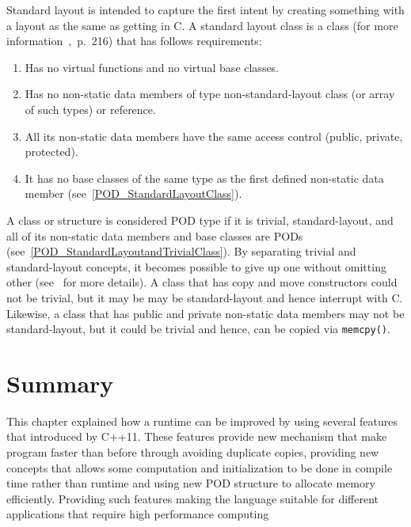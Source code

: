 \documentclass[11pt]{report}
\begin{document}
Standard layout is intended to capture the first intent by creating something with a layout as the same as getting in C. A standard layout class is a class (for more information~\cite{ISO:2011:Cpplanguage},~p.~216) that has follows requirements:

\begin{enumerate}
\item	Has no virtual functions and no virtual base classes.
\item	Has no non-static data members of type non-standard-layout class (or array of such types) or reference.
\item	All its non-static data members have the same access control (public, private, protected).
\item	It has no base classes of the same type as the first defined non-static data member (see~\ref{POD_StandardLayoutClass}).
\end{enumerate}
A class or structure is considered POD type if it is trivial, standard-layout, and all of its non-static data members and base classes are PODs (see~\ref{POD_StandardLayoutandTrivialClass}). By separating trivial and standard-layout concepts, it becomes possible to give up one without omitting other (see~\cite{Stroustrup:2012:Cpp11} for more details). A class that has copy  and move constructors could not be trivial, but it may be may be standard-layout and hence interrupt with C. Likewise, a class that has  public and private non-static data members may not be standard-layout, but it could be trivial and hence, can be copied via \texttt{memcpy()}.

\section{Summary}
\label{sec: Summary}
This chapter explained how a runtime can be improved by using several features that introduced by C++11.  These features provide new mechanism that make program faster than before through avoiding duplicate copies, providing new concepts that allows some computation and initialization to be done in compile time rather than runtime and using new POD structure to allocate memory efficiently. Providing such features making the language suitable for different applications that require high performance computing

\end{document}

